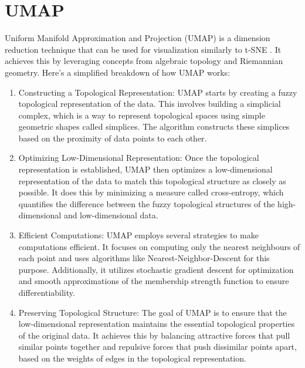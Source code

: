 \section{UMAP}
Uniform Manifold Approximation and Projection (UMAP) is a dimension reduction technique that can be used for visualization similarly to t-SNE \cite{https://doi.org/10.48550/arxiv.1802.03426}. It achieves this by leveraging concepts from algebraic topology and Riemannian geometry.
Here's a simplified breakdown of how UMAP works:
\begin{enumerate}
\item Constructing a Topological Representation: UMAP starts by creating a fuzzy topological representation of the data. This involves building a simplicial complex, which is a way to represent topological spaces using simple geometric shapes called simplices. The algorithm constructs these simplices based on the proximity of data points to each other.
\item Optimizing Low-Dimensional Representation: Once the topological representation is established, UMAP then optimizes a low-dimensional representation of the data to match this topological structure as closely as possible. It does this by minimizing a measure called cross-entropy, which quantifies the difference between the fuzzy topological structures of the high-dimensional and low-dimensional data.
\item Efficient Computations: UMAP employs several strategies to make computations efficient. It focuses on computing only the nearest neighbours of each point and uses algorithms like Nearest-Neighbor-Descent for this purpose. Additionally, it utilizes stochastic gradient descent for optimization and smooth approximations of the membership strength function to ensure differentiability.
\item Preserving Topological Structure: The goal of UMAP is to ensure that the low-dimensional representation maintains the essential topological properties of the original data. It achieves this by balancing attractive forces that pull similar points together and repulsive forces that push dissimilar points apart, based on the weights of edges in the topological representation.
\end{enumerate}
